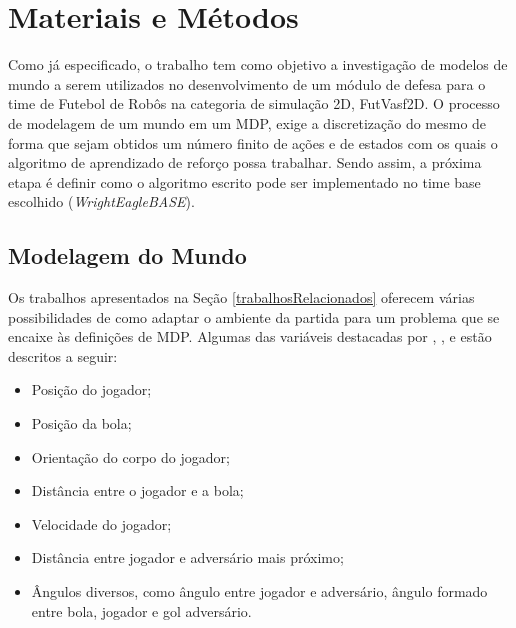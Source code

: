\chapter{Materiais e Métodos} \label{sec:newModule} %

Como já especificado, o trabalho tem como objetivo a investigação de modelos de
mundo a serem utilizados no desenvolvimento de um módulo de defesa para o time de
Futebol de Robôs na categoria de simulação 2D, FutVasf2D. O processo de
modelagem de um mundo em um MDP, exige a discretização do mesmo de forma que
sejam obtidos um número finito de ações e de estados com os quais o algoritmo de
aprendizado de reforço possa trabalhar. Sendo assim, a próxima etapa é definir
como o algoritmo escrito pode ser implementado no time base escolhido
(\textit{WrightEagleBASE}).

\section{Modelagem do Mundo}\label{modelagem}

Os trabalhos apresentados na Seção \ref{trabalhosRelacionados} oferecem várias
possibilidades de como adaptar o ambiente da partida para um problema que se
encaixe às definições de MDP. Algumas das variáveis destacadas por
, ,
 e  estão descritos a
seguir:

\begin{itemize}
    \item Posição do jogador;
    \item Posição da bola;
    \item Orientação do corpo do jogador;
    \item Distância entre o jogador e a bola;
    \item Velocidade do jogador;
    \item Distância entre jogador e adversário mais próximo;
    \item Ângulos diversos, como ângulo entre jogador e adversário, ângulo
    formado entre bola, jogador e gol adversário.
\end{itemize}

